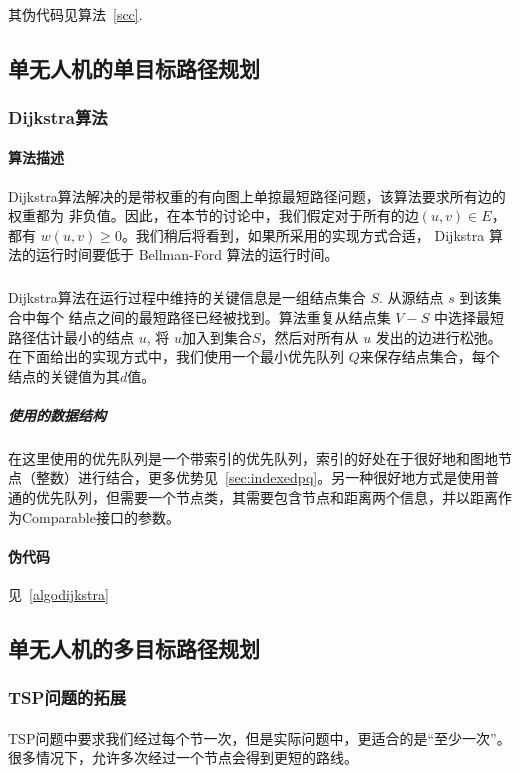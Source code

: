 \documentclass[UTF8,a4paper]{ctexart}
\begin{document}
\paragraph{}其伪代码见算法~\ref{scc}.


\subsection{单无人机的单目标路径规划}
\subsubsection{Dijkstra算法}\label{sec:dijkstra}
\paragraph{算法描述}Dijkstra算法解决的是带权重的有向图上单掠最短路径问题，该算法要求所有边的权重都为 非负值。因此，在本节的讨论中，我们假定对于所有的边$(u,v)\in E$，都有 $w(u,v)\geq 0$。我们稍后将看到，如果所采用的实现方式合适， Dijkstra 算法的运行时间要低于 Bellman-Ford 算法的运行时间。
\subparagraph{}Dijkstra算法在运行过程中维持的关键信息是一组结点集合 {$S$}. 从源结点 {$s$} 到该集合中每个 结点之间的最短路径已经被找到。算法重复从结点集 $V-S$ 中选择最短路径估计最小的结点 $u$, 将 $u$加入到集合$S$，然后对所有从 $u$ 发出的边进行松弛。在下面给出的实现方式中，我们使用一个最小优先队列 $Q$来保存结点集合，每个结点的关键值为其$d$值。
\subparagraph{使用的数据结构}在这里使用的优先队列是一个带索引的优先队列，索引的好处在于很好地和图地节点（整数）进行结合，更多优势见~\ref{sec:indexedpq}。另一种很好地方式是使用普通的优先队列，但需要一个节点类，其需要包含节点和距离两个信息，并以距离作为Comparable接口的参数。
\paragraph{伪代码}见~\ref{algodijkstra}

\subsection{单无人机的多目标路径规划}\label{sec:solutionTSP}
\subsubsection{TSP问题的拓展}\label{sec:tspEXT}
\paragraph{}TSP问题中要求我们经过每个节一次，但是实际问题中，更适合的是“至少一次”。很多情况下，允许多次经过一个节点会得到更短的路线。
\end{document}
